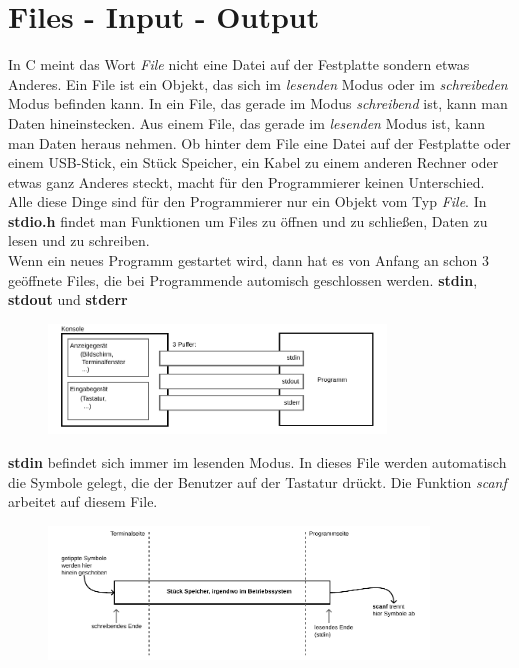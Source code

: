 \documentclass[c_worksheet.tex]{subfiles}
\begin{document}
  
\chapter{Files - Input - Output}
In C meint das Wort \textit{File} nicht eine Datei auf der Festplatte sondern etwas Anderes. Ein File ist ein Objekt, das sich im \textit{lesenden} Modus oder im \textit{schreibeden} Modus befinden kann. In ein File, das gerade im Modus \textit{schreibend} ist, kann man Daten hineinstecken. Aus einem File, das gerade im \textit{lesenden} Modus ist, kann man Daten heraus nehmen. Ob hinter dem File eine Datei auf der Festplatte oder einem USB-Stick, ein Stück Speicher, ein Kabel zu einem anderen Rechner oder etwas ganz Anderes steckt, macht für den Programmierer keinen Unterschied. Alle diese Dinge sind für den Programmierer nur ein Objekt vom Typ \textit{File}. In \textbf{stdio.h} findet man Funktionen um Files zu öffnen und zu schließen, Daten zu lesen und zu schreiben.\\
Wenn ein neues Programm gestartet wird, dann hat es von Anfang an schon 3 geöffnete Files, die bei Programmende automisch geschlossen werden. \textbf{stdin}, \textbf{stdout} und \textbf{stderr}

\begin{figure}[h]
\centering
\includegraphics[width=0.8\textwidth]{./Grafiken/Files/stdFiles}
\end{figure}

\textbf{stdin} befindet sich immer im lesenden Modus. In dieses File werden automatisch die Symbole gelegt, die der Benutzer auf der Tastatur drückt. Die Funktion \textit{scanf} arbeitet auf diesem File.

\begin{figure}[h]
\centering
\includegraphics[width=0.9\textwidth]{./Grafiken/Files/stdin}
\end{figure}
\end{document}
